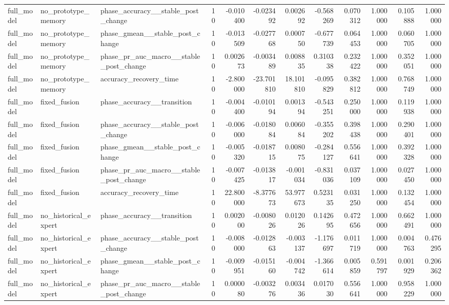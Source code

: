 \begin{tabular}{lllrrrrrrrrr}
full\_model & no\_prototype\_memory & phase\_accuracy\_\_stable\_post\_change & 10 & -0.010400 & -0.023492 & 0.002692 & -0.568269 & 0.070312 & 1.000000 & 0.105888 & 1.000000 \\
full\_model & no\_prototype\_memory & phase\_gmean\_\_stable\_post\_change & 10 & -0.013509 & -0.027768 & 0.000750 & -0.677739 & 0.064453 & 1.000000 & 0.060705 & 1.000000 \\
full\_model & no\_prototype\_memory & phase\_pr\_auc\_macro\_\_stable\_post\_change & 10 & 0.002673 & -0.003489 & 0.008835 & 0.310338 & 0.232422 & 1.000000 & 0.352051 & 1.000000 \\
full\_model & no\_prototype\_memory & accuracy\_recovery\_time & 10 & -2.800000 & -23.701810 & 18.101810 & -0.095829 & 0.382812 & 1.000000 & 0.768749 & 1.000000 \\
full\_model & fixed\_fusion & phase\_accuracy\_\_transition & 10 & -0.004400 & -0.010194 & 0.001394 & -0.543251 & 0.250000 & 1.000000 & 0.119938 & 1.000000 \\
full\_model & fixed\_fusion & phase\_accuracy\_\_stable\_post\_change & 10 & -0.006000 & -0.018084 & 0.006084 & -0.355202 & 0.398438 & 1.000000 & 0.290401 & 1.000000 \\
full\_model & fixed\_fusion & phase\_gmean\_\_stable\_post\_change & 10 & -0.005320 & -0.018715 & 0.008075 & -0.284127 & 0.556641 & 1.000000 & 0.392328 & 1.000000 \\
full\_model & fixed\_fusion & phase\_pr\_auc\_macro\_\_stable\_post\_change & 10 & -0.007425 & -0.013817 & -0.001034 & -0.831036 & 0.037109 & 1.000000 & 0.027450 & 1.000000 \\
full\_model & fixed\_fusion & accuracy\_recovery\_time & 10 & 22.800000 & -8.377673 & 53.977673 & 0.523135 & 0.031250 & 1.000000 & 0.132454 & 1.000000 \\
full\_model & no\_historical\_expert & phase\_accuracy\_\_transition & 10 & 0.002000 & -0.008026 & 0.012026 & 0.142695 & 0.472656 & 1.000000 & 0.662491 & 1.000000 \\
full\_model & no\_historical\_expert & phase\_accuracy\_\_stable\_post\_change & 10 & -0.008000 & -0.012863 & -0.003137 & -1.176697 & 0.011719 & 1.000000 & 0.004763 & 0.476295 \\
full\_model & no\_historical\_expert & phase\_gmean\_\_stable\_post\_change & 10 & -0.009951 & -0.015160 & -0.004742 & -1.366614 & 0.005859 & 0.591797 & 0.001929 & 0.206362 \\
full\_model & no\_historical\_expert & phase\_pr\_auc\_macro\_\_stable\_post\_change & 10 & 0.000080 & -0.003276 & 0.003436 & 0.017030 & 0.556641 & 1.000000 & 0.958229 & 1.000000 \\

\end{tabular}
